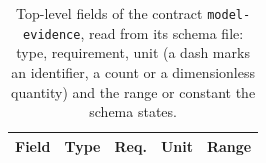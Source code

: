 \begin{table}[t]\centering\footnotesize
\caption{Top-level fields of the contract \texttt{model-evidence}, read from its schema file: type, requirement, unit (a dash marks an identifier, a count or a dimensionless quantity) and the range or constant the schema states.}\label{tab:contract-model-evidence}
\begin{tabular}{@{}l l c l >{\raggedright\arraybackslash}p{}@{}}\toprule Field & Type & Req. & Unit & Range\\\midrule
\bottomrule\end{tabular}\end{table}
